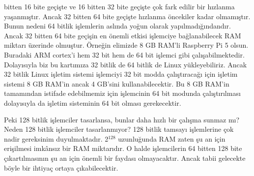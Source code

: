 \documentclass[letterpaper,10pt,turkish]{sphinxmanual}
\begin{document}
 bitten 16 bite geçişte ve 16 bitten 32 bite geçişte çok fark edilir bir hızlanma yaşanmıştır.
Ancak 32 bitten 64 bite geçişte hızlanma öncekiler kadar olmamıştır. Bunun nedeni 64 bitlik
işlemlerin aslında yoğun olarak yapılmadığındandır. Ancak 32 bitten 64 bite geçişin en önemli
etkisi işlemciye bağlanabilecek RAM miktarı üzerinde olmuştur. Örneğin elimizde 8 GB RAM’li
Raspberry Pi 5 olsun. Buradaki ARM cortex’i hem 32 bit hem de 64 bit işlemci gibi
çalışabilmektedir. Dolayısıyla biz bu kartımıza 32 bitlik de 64 bitlik de Linux yükleyebiliriz.
Ancak 32 bitlik Linux işletim sistemi işlemciyi 32 bit modda çalıştıracağı için işletim sistemi
8 GB RAM’in ancak 4 GB’sini kullanabilecektir. Bu 8 GB RAM’in tamamından istifade edebilmemiz
için işlemcinin 64 bit modunda çalıştırılması dolayısıyla da işletim sisteminin 64 bit olması
gerekecektir.

\sphinxAtStartPar
Peki 128 bitlik işlemciler tasarlansa, bunlar daha hızlı bir çalışma sunmaz mı? Neden 128 bitlik
işlemciler tasarlanmıyor? 128 bitlik tamsayı işlemlerine çok nadir gereksinim duyulmaktadır.
2$^{\text{128}}$ uzunluğunda RAM zaten şu an için erişilmesi imkânsız bir RAM miktarıdır. O halde
işlemcilerin 64 bitten 128 bite çıkartılmasının şu an için önemli bir faydası olmayacaktır.
Ancak tabii gelecekte böyle bir ihtiyaç ortaya çıkabilecektir.
\end{document}
